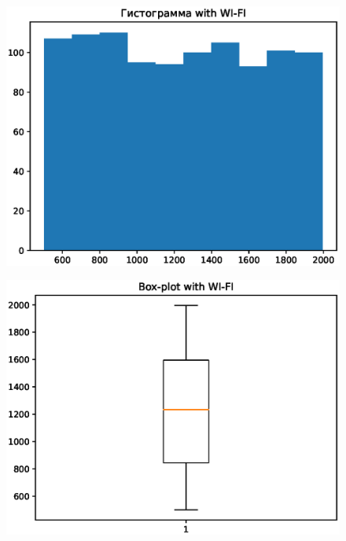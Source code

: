 \documentclass{article}
\begin{document}
\begin{figure}[!h]
\begin{center}
\includegraphics [scale=0.4]{images/hist2.eps}
\end{center}
\end{figure}

\begin{figure}[!h]
\begin{center}
\includegraphics [scale=0.4]{images/box2.eps}
\end{center}
\end{figure}
\end{document}
